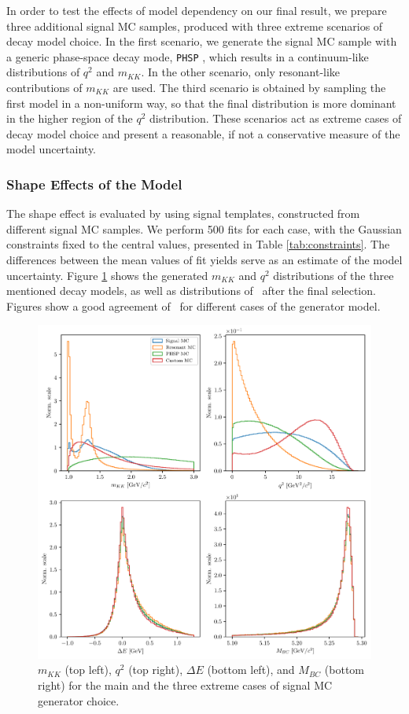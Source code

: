 In order to test the effects of model dependency on our final result, we prepare three additional signal MC samples, produced with three extreme scenarios of decay model choice. In the first scenario, we generate the signal MC sample with a generic phase-space decay mode, \texttt{PHSP} \cite{lange2001evtgen}, which results in a continuum-like distributions of $q^2$ and $m_{KK}$. In the other scenario, only resonant-like contributions of $m_{KK}$ are used. The third scenario is obtained by sampling the first model in a non-uniform way, so that the final distribution is more dominant in the higher region of the $q^2$ distribution. These scenarios act as extreme cases of decay model choice and present a reasonable, if not a conservative measure of the model uncertainty. 

\subsubsection{Shape Effects of the Model}
The shape effect is evaluated by using signal templates, constructed from different signal MC samples. We perform 500 fits for each case, with the Gaussian constraints fixed to the central values, presented in Table \ref{tab:constraints}. The differences between the mean values of fit yields serve as an estimate of the model uncertainty. Figure \ref{fig:model_cases} shows the generated $m_{KK}$ and $q^2$ distributions of the three mentioned decay models, as well as distributions of \vars~after the final selection. Figures show a good agreement of \vars~for different cases of the generator model.
\begin{figure}[H]
	\centering
	\captionsetup{width=0.8\linewidth}
	\includegraphics[width=\linewidth]{fig/model_cases}
	\caption{$m_{KK}$ (top left), $q^2$ (top right), $\Delta E$ (bottom left), and $M_{BC}$ (bottom right) for the main and the three extreme cases of signal MC generator choice.}
	\label{fig:model_cases}
\end{figure}
